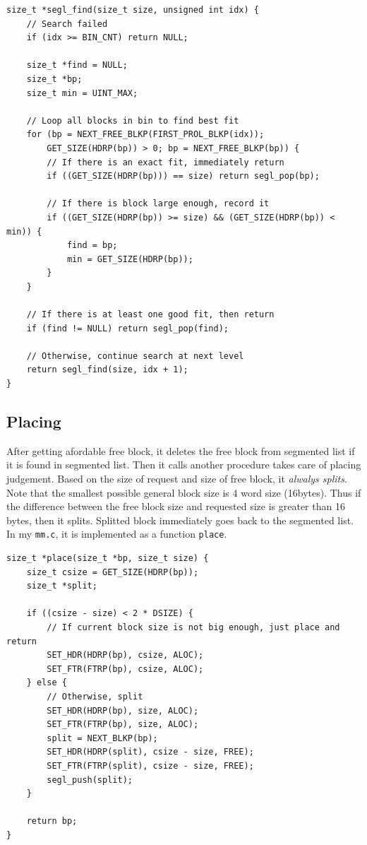 \documentclass[fleqn]{article}
\begin{document}
\small
\begin{verbatim}
size_t *segl_find(size_t size, unsigned int idx) {
    // Search failed
    if (idx >= BIN_CNT) return NULL;
    
    size_t *find = NULL;
    size_t *bp;
    size_t min = UINT_MAX;

    // Loop all blocks in bin to find best fit
    for (bp = NEXT_FREE_BLKP(FIRST_PROL_BLKP(idx));
        GET_SIZE(HDRP(bp)) > 0; bp = NEXT_FREE_BLKP(bp)) {
        // If there is an exact fit, immediately return
        if ((GET_SIZE(HDRP(bp))) == size) return segl_pop(bp);

        // If there is block large enough, record it
        if ((GET_SIZE(HDRP(bp)) >= size) && (GET_SIZE(HDRP(bp)) < min)) {
            find = bp;
            min = GET_SIZE(HDRP(bp));
        }
    }

    // If there is at least one good fit, then return
    if (find != NULL) return segl_pop(find);

    // Otherwise, continue search at next level
    return segl_find(size, idx + 1);
}
\end{verbatim}
\normalsize

\subsection{Placing}

After getting afordable free block, it deletes the free block from segmented list if it is found in segmented list. Then it calls another procedure takes care of placing judgement. Based on the size of request and size of free block, it \textit{alwalys splits}. Note that the smallest possible general block size is 4 word size (16bytes). Thus if the difference between the free block size and requested size is greater than 16 bytes, then it splits. Splitted block immediately goes back to the segmented list. In my \texttt{mm.c}, it is implemented as a function \texttt{place}.

\small
\begin{verbatim}
size_t *place(size_t *bp, size_t size) {
    size_t csize = GET_SIZE(HDRP(bp));
    size_t *split;

    if ((csize - size) < 2 * DSIZE) {
        // If current block size is not big enough, just place and return
        SET_HDR(HDRP(bp), csize, ALOC);
        SET_FTR(FTRP(bp), csize, ALOC);
    } else {
        // Otherwise, split
        SET_HDR(HDRP(bp), size, ALOC);
        SET_FTR(FTRP(bp), size, ALOC);
        split = NEXT_BLKP(bp);
        SET_HDR(HDRP(split), csize - size, FREE);
        SET_FTR(FTRP(split), csize - size, FREE);
        segl_push(split);
    }

    return bp;
}
\end{verbatim}
\normalsize
\end{document}
